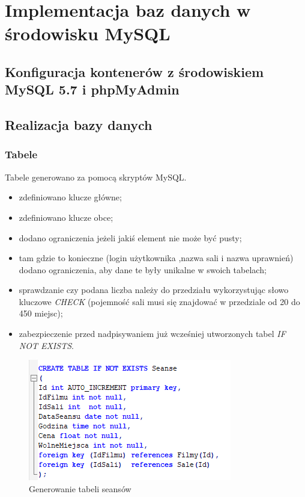 \chapter{Implementacja baz danych w środowisku MySQL}

\section{Konfiguracja kontenerów z środowiskiem MySQL 5.7 i phpMyAdmin}


\section{Realizacja bazy danych}

\subsection{Tabele}

Tabele generowano za pomocą skryptów MySQL.

\begin{itemize}
	\item zdefiniowano klucze główne;
	\item zdefiniowano klucze obce;
	\item dodano ograniczenia jeżeli jakiś element nie może być pusty;
	\item tam gdzie to konieczne (login użytkownika ,nazwa sali i nazwa uprawnień) dodano ograniczenia, aby dane te były unikalne w swoich tabelach;
	\item sprawdzanie czy podana liczba należy do przedziału wykorzystując słowo kluczowe \textit{CHECK} (pojemność sali musi się znajdować w przedziale od 20 do 450 miejsc);
	\item zabezpieczenie przed nadpisywaniem już wcześniej utworzonych tabel \textit{IF NOT EXISTS}.
\end{itemize}

\begin{figure} [H]
	\centering
	\includegraphics[width=0.6\linewidth]{rozdzial04/T_Seanse.png}
	\caption{Generowanie tabeli seansów}
	\label{fig:t_seanse}
\end{figure}

